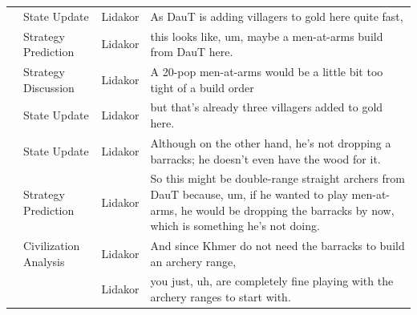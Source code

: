 {\begin{longtable}{@{}>{\theAppRow}r|L{2.3cm}L{1.0cm}U{11.55cm}@{}}
    & State Update          & Lidakor & As DauT is adding villagers to gold here quite fast,                                                                                                                                                                                                                                            \\
    & Strategy Prediction   & Lidakor & this looks like, um, maybe a men-at-arms build from DauT here.                                                                                                                                                                                                                                  \\
    & Strategy Discussion   & Lidakor & A 20-pop men-at-arms would be a little bit too tight of a build order                                                                                                                                                                                                                           \\
    & State Update          & Lidakor & but that's already three villagers added to gold here.                                                                                                                                                                                                                                          \\
    & State Update          & Lidakor & Although on the other hand, he's not dropping a barracks; he doesn't even have the wood for it.                                                                                                                                                                                                 \\
    & Strategy Prediction   & Lidakor & So this might be double-range straight archers from DauT because, um, if he wanted to play men-at-arms, he would be dropping the barracks by now, which is something he's not doing.                                                                                                            \\
    & Civilization Analysis & Lidakor & And since Khmer do not need the barracks to build an archery range,                                                                                                                                                                                                                              \\
    &                      & Lidakor & you just, uh, are completely fine playing with the archery ranges to start with.                                                                                                                                                                                                                 \\

\end{longtable}}
